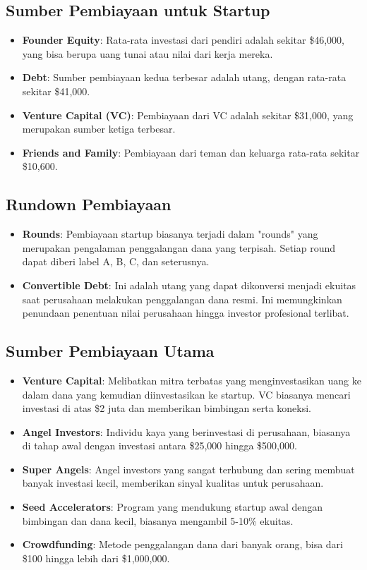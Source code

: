 \documentclass{article}
\begin{document}
\subsection{Sumber Pembiayaan untuk Startup}
\begin{itemize}
    \item \textbf{Founder Equity}: Rata-rata investasi dari pendiri adalah sekitar \$46,000, yang bisa berupa uang tunai atau nilai dari kerja mereka.
    \item \textbf{Debt}: Sumber pembiayaan kedua terbesar adalah utang, dengan rata-rata sekitar \$41,000.
    \item \textbf{Venture Capital (VC)}: Pembiayaan dari VC adalah sekitar \$31,000, yang merupakan sumber ketiga terbesar.
    \item \textbf{Friends and Family}: Pembiayaan dari teman dan keluarga rata-rata sekitar \$10,600.
\end{itemize}

\subsection{Rundown Pembiayaan}
\begin{itemize}
    \item \textbf{Rounds}: Pembiayaan startup biasanya terjadi dalam "rounds" yang merupakan pengalaman penggalangan dana yang terpisah. Setiap round dapat diberi label A, B, C, dan seterusnya.
    \item \textbf{Convertible Debt}: Ini adalah utang yang dapat dikonversi menjadi ekuitas saat perusahaan melakukan penggalangan dana resmi. Ini memungkinkan penundaan penentuan nilai perusahaan hingga investor profesional terlibat.
\end{itemize}

\subsection{Sumber Pembiayaan Utama}
\begin{itemize}
    \item \textbf{Venture Capital}: Melibatkan mitra terbatas yang menginvestasikan uang ke dalam dana yang kemudian diinvestasikan ke startup. VC biasanya mencari investasi di atas \$2 juta dan memberikan bimbingan serta koneksi.
    \item \textbf{Angel Investors}: Individu kaya yang berinvestasi di perusahaan, biasanya di tahap awal dengan investasi antara \$25,000 hingga \$500,000.
    \item \textbf{Super Angels}: Angel investors yang sangat terhubung dan sering membuat banyak investasi kecil, memberikan sinyal kualitas untuk perusahaan.
    \item \textbf{Seed Accelerators}: Program yang mendukung startup awal dengan bimbingan dan dana kecil, biasanya mengambil 5-10\% ekuitas.
    \item \textbf{Crowdfunding}: Metode penggalangan dana dari banyak orang, bisa dari \$100 hingga lebih dari \$1,000,000.
\end{itemize}
\end{document}
